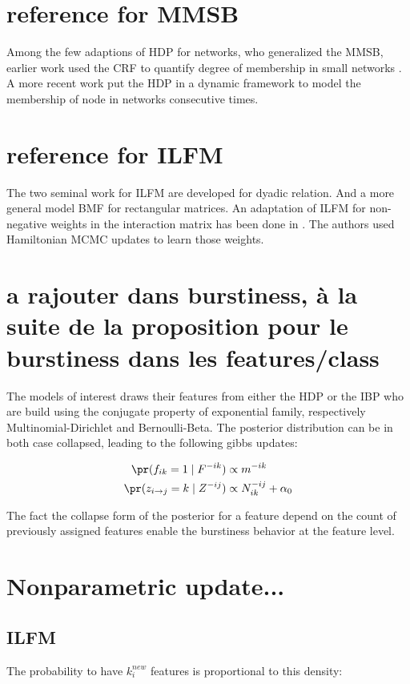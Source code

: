 
\section{reference for MMSB}

Among the few adaptions of HDP for networks, who generalized the MMSB, earlier work used the CRF to quantify degree of membership in small networks \cite{iMMSB}. A more recent work \cite{diMMSB} put the HDP in a dynamic framework to model the membership of node in networks consecutive times. 


\section{reference for ILFM}
The two seminal work for ILFM are \cite{ILFRM} developed for dyadic relation. And a more general model BMF \cite{BMF} for rectangular matrices. An adaptation of ILFM for non-negative weights in the interaction matrix has been done in \cite{IMRM}. The authors used Hamiltonian MCMC updates to learn those weights.

\section{a rajouter dans burstiness, à la suite de la proposition pour le burstiness dans les features/class}

The models of interest draws their features from either the HDP or the IBP who are build using the conjugate property of exponential family, respectively Multinomial-Dirichlet and Bernoulli-Beta. The posterior distribution can be in both case collapsed, leading to the following gibbs updates:

\begin{align}
    \pr(f_{ik} = 1 \mid F^{-ik}) &\propto m^{-ik} \\
    \pr(z_{i\rightarrow j} =k \mid Z^{-ij}) &\propto N_{ik}^{-ij} + \alpha_0
\end{align}

The fact the collapse form of the posterior for a feature depend on the count of previously assigned features enable the burstiness behavior at the feature level.


\section{Nonparametric update...}

\subsection{ILFM}
The probability to have $k_i^{new}$ features is proportional to this density:

